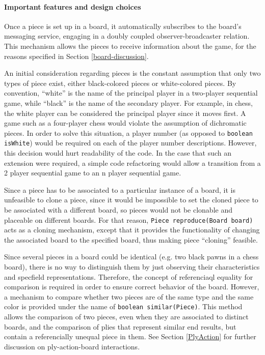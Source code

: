 	 				\paragraph{Important features and design choices} 
	 											Once a piece is set up in a board, it automatically subscribes to 
	 											the board's messaging service, engaging in a doubly coupled 
	 											observer-broadcaster relation. This mechanism allows the pieces
	 											to receive information about the game, for the reasons specified
	 											in Section \ref{board-discussion}. 
	 							
	 											An initial consideration regarding pieces is the constant assumption 
	 											that only two types of piece exist, either black-colored pieces
	 											or white-colored pieces. By convention, ``white'' is the name
	 											of the principal player in a two-player sequential game, while
	 											``black'' is the name of the secondary player. For example, in chess, 
	 											the white player can be considered the principal player since it 
	 											moves first. A game such as a four-player chess would violate the
	 											assumption of dichromatic pieces. In order to solve this situation, 
	 											a player number (as opposed to \texttt{boolean isWhite}) would be 
	 											required on each of the player number descriptions. However,
	 											this decision would hurt readability of the code. In the case that
	 											such an extension were required, a simple code refactoring would 
	 											allow a transition from a 2 player sequential game to an n player
	 											sequential game.
	 						
	 											Since a piece has to be associated to a particular instance of a board, 
	 											it is unfeasible to clone a piece, since it would be impossible to set the
	 											cloned piece to be associated with a different board, so pieces would not
	 											be clonable and placeable on different boards. For that reason, 
	 											\texttt{Piece reproduce(Board board)} acts as a cloning mechanism, except 
	 											that it provides the functionality of changing the associated board to 
	 											the specified board, thus making piece ``cloning'' feasible. 
	 											
	 											Since several pieces in a board could be identical (e.g. two black pawns
	 											in a chess board), there is no way to distinguish them by just observing
	 											their characteristics and specfield representations. Therefore, the concept
	 											of referenciaql equality for comparison is required in order to ensure
	 											correct behavior of the board. However, a mechanism to compare whether
	 											two pieces are of the same type and the same color is provided under
	 											the name of \texttt{boolean similar(Piece)}. This method allows the comparison
	 											of two pieces, even when they are associated to distinct boards, and the comparison
	 											of plies that represent similar end results, but contain a referencially unequal 
	 											piece in them. See Section \ref{PlyAction} for further discussion on ply-action-board
	 											interactions. 
	 											
